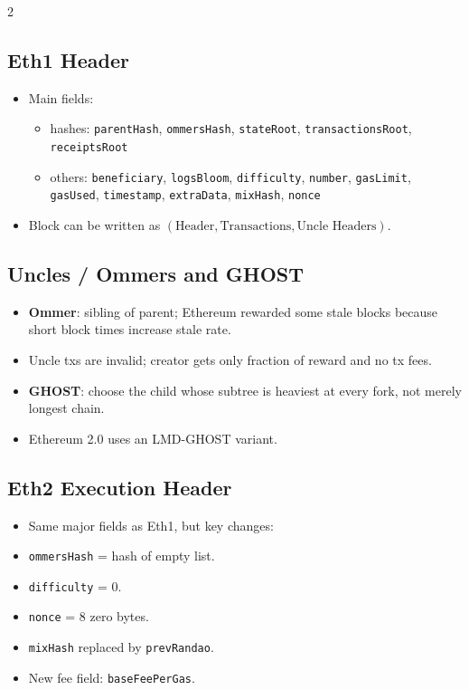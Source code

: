 \documentclass[10pt,a4paper]{article}
\newcommand{\term}[1]{\textbf{#1}}
\newcommand{\code}[1]{\texttt{#1}}
\begin{document}
\begin{multicols*}{2}
\subsection*{Eth1 Header}
\begin{itemize}
\item Main fields:
\begin{itemize}
\item hashes: \code{parentHash}, \code{ommersHash}, \code{stateRoot}, \code{transactionsRoot}, \code{receiptsRoot}
\item others: \code{beneficiary}, \code{logsBloom}, \code{difficulty}, \code{number}, \code{gasLimit}, \code{gasUsed}, \code{timestamp}, \code{extraData}, \code{mixHash}, \code{nonce}
\end{itemize}
\item Block can be written as $(\text{Header}, \text{Transactions}, \text{Uncle Headers})$.
\end{itemize}

\subsection*{Uncles / Ommers and GHOST}
\begin{itemize}
\item \term{Ommer}: sibling of parent; Ethereum rewarded some stale blocks because short block times increase stale rate.
\item Uncle txs are invalid; creator gets only fraction of reward and no tx fees.
\item \term{GHOST}: choose the child whose subtree is heaviest at every fork, not merely longest chain.
\item Ethereum 2.0 uses an LMD-GHOST variant.
\end{itemize}

\subsection*{Eth2 Execution Header}
\begin{itemize}
\item Same major fields as Eth1, but key changes:
\item \code{ommersHash} = hash of empty list.
\item \code{difficulty} = 0.
\item \code{nonce} = 8 zero bytes.
\item \code{mixHash} replaced by \code{prevRandao}.
\item New fee field: \code{baseFeePerGas}.
\end{itemize}


\end{multicols*}
\end{document}
